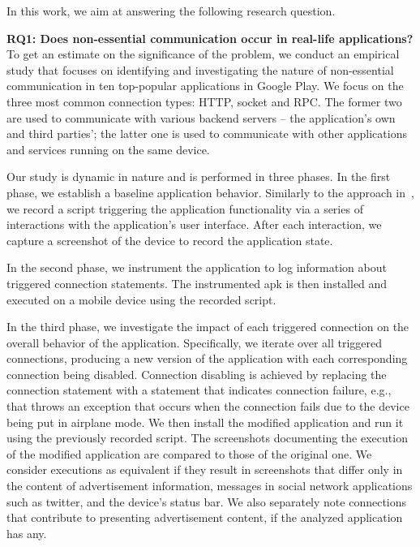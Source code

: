 In this work, we aim at answering the following research question. 

\vspace{0.1in}
\noindent 
{\bf RQ1: Does non-essential communication occur in real-life applications?}
To get an  estimate on the significance of the problem, we conduct an empirical study 
that focuses on identifying and investigating the nature of non-essential communication in ten top-popular applications in Google Play. 
We focus on the three most common connection types: HTTP, socket and RPC.
The former two are used to communicate with various backend servers -- the application's own and third parties'; 
the latter one is used to communicate with other applications and services running on the same device.

Our study is dynamic in nature and is performed in three phases. 
In the first phase, we establish a baseline application behavior. 
Similarly to the approach in~\cite{Hornyack:Han:Jung:Schechter:Wetherall:CCS11}, we record a script triggering the application functionality via a series of interactions with the application's user interface. 
After each interaction, we capture a screenshot of the device to record the application state. 

In the second phase, we instrument the application to log information about 
triggered connection statements. The instrumented apk is then installed and executed on a mobile device using the recorded script. 

In the third phase, we investigate the impact of each triggered connection on the overall behavior of the application.
Specifically, we iterate over all triggered connections, producing a new version of the application with each corresponding connection being disabled. Connection disabling is achieved by replacing the connection statement with a
statement that indicates connection failure, e.g., that throws an exception that occurs when the connection fails due to the device being put in airplane mode. 
We then install the modified application and run it using the previously recorded script. The screenshots documenting 
the execution of the modified application are compared to those of the original one. We consider executions as equivalent if they result in screenshots that differ only in the content of advertisement information, messages in social network applications such as twitter, and the device's status bar. 
We also separately note connections that contribute to presenting advertisement content, if the analyzed application has any. 

